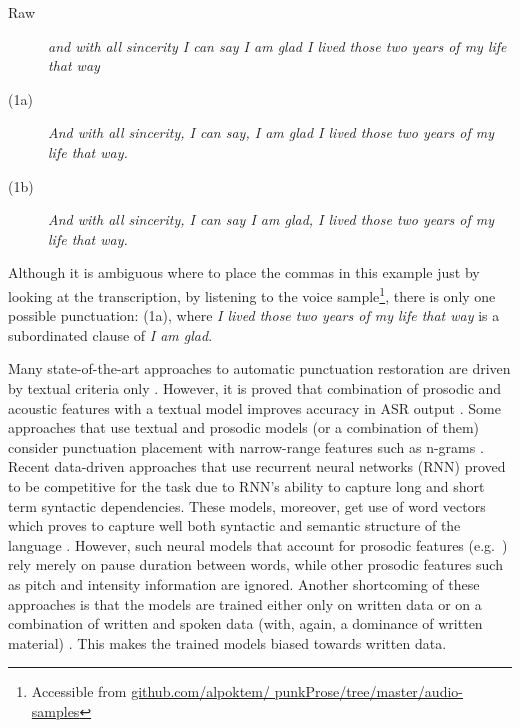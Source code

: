 \vfill

\begin{description}
\item [Raw] {\it and with all sincerity I can say I am glad I lived those two years of my life that way} 
\item [(1a)] {\it And with all sincerity, I can say, I am glad I lived those two years of my life that way.}
\item [(1b)] {\it And with all sincerity, I can say I am glad, I lived those two years of my life that way.}
\end{description}

\noindent Although it is ambiguous where to place the commas in this example just by looking at the transcription, by listening to the voice sample\footnote{Accessible from \url{github.com/alpoktem/ punkProse/tree/master/audio-samples}}, there is only one possible punctuation: (1a), where {\it I lived those two years of my life that way} is a subordinated clause of {\it I am glad}. 

Many state-of-the-art approaches to automatic punctuation restoration are driven by textual criteria only \citep{Cho2017NMTbasedSA, lu2010better, ueffing2013improved, Gravano,  jakubicek2010punctuation, Che2016PunctuationPF}. However, it is proved that combination of prosodic and acoustic features with a textual model improves accuracy in ASR output \citep{baron2002automatic, khomitsevich2015combining, tilk2015lstm, tilk2016bidirectional}. Some approaches that use textual and prosodic models (or a combination of them) consider punctuation placement with narrow-range features such as n-grams \citep{liu2006study, khomitsevich2015combining, Psutka04automaticpunctuation}. Recent data-driven approaches that use recurrent neural networks (RNN) proved to be competitive for the task due to RNN's ability to capture long and short term syntactic dependencies. These models, moreover, get use of word vectors which proves to capture well both syntactic and semantic structure of the language \citep{Treviso, Che2016PunctuationPF}. However, such neural models that account for prosodic features (e.g.~\cite{tilk2015lstm, tilk2016bidirectional}) rely merely on pause duration between words, while other prosodic features such as pitch and intensity information are ignored. Another shortcoming of these approaches is that the models are trained either only on written data \citep{ballesterosneural, Che2016PunctuationPF} or on a combination of written and spoken data (with, again, a dominance of written material) \citep{tilk2016bidirectional}. This makes the trained models biased towards written data. 

